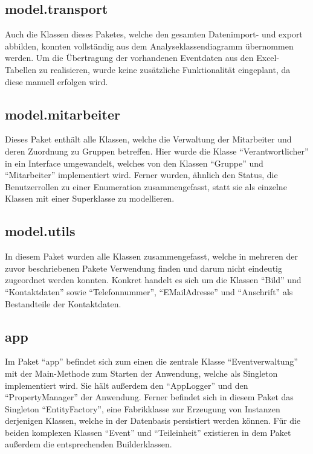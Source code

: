 \subsection{model.transport}
Auch die Klassen dieses Paketes, welche den gesamten Datenimport- und export abbilden, konnten vollständig aus dem Analyseklassendiagramm übernommen werden. Um die Übertragung der vorhandenen Eventdaten aus den Excel-Tabellen zu realisieren, wurde keine zusätzliche Funktionalität eingeplant, da diese manuell erfolgen wird.

\subsection{model.mitarbeiter}
Dieses Paket enthält alle Klassen, welche die Verwaltung der Mitarbeiter und deren Zuordnung zu Gruppen betreffen. Hier wurde die Klasse \enquote{Verantwortlicher} in ein Interface umgewandelt, welches von den Klassen \enquote{Gruppe} und \enquote{Mitarbeiter} implementiert wird. Ferner wurden, ähnlich den Status, die Benutzerrollen zu einer Enumeration zusammengefasst, statt sie als einzelne Klassen mit einer Superklasse zu modellieren.

\subsection{model.utils}
In diesem Paket wurden alle Klassen zusammengefasst, welche in mehreren der zuvor beschriebenen Pakete Verwendung finden und darum nicht eindeutig zugeordnet werden konnten. Konkret handelt es sich um die Klassen \enquote{Bild} und \enquote{Kontaktdaten} sowie \enquote{Telefonnummer}, \enquote{EMailAdresse} und \enquote{Anschrift} als Bestandteile der Kontaktdaten.

\subsection{app}
Im Paket \enquote{app} befindet sich zum einen die zentrale Klasse \enquote{Eventverwaltung} mit der Main-Methode zum Starten der Anwendung, welche als Singleton implementiert wird. Sie hält außerdem den \enquote{AppLogger} und den \enquote{PropertyManager} der Anwendung. Ferner befindet sich in diesem Paket das Singleton \enquote{EntityFactory}, eine Fabrikklasse zur Erzeugung von Instanzen derjenigen Klassen, welche in der Datenbasis persistiert werden können. Für die beiden komplexen Klassen \enquote{Event} und \enquote{Teileinheit} existieren in dem Paket außerdem die entsprechenden Builderklassen.

